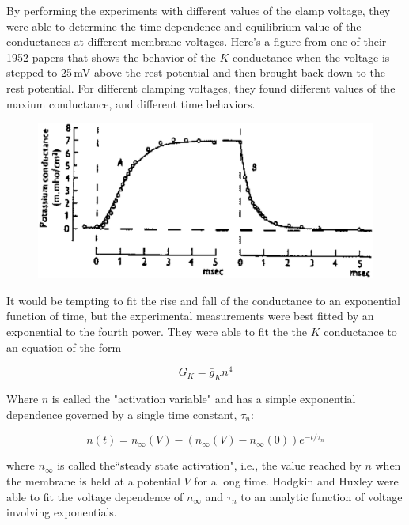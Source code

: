 \documentclass[12pt]{article}
\begin{document}
By performing the experiments with different values of the clamp voltage, they were able to determine the time dependence and equilibrium value of the conductances at different membrane voltages. Here's a figure from one of their 1952 papers that shows the behavior of the $K$ conductance when the voltage is stepped to 25\,mV above the rest potential and then brought back down to the rest potential. For different clamping voltages, they found different values of the maxium conductance, and different time behaviors.

\begin{figure}[h]
  \centering
 \includegraphics[scale=0.5]{figs/vcdata.eps}
  \label{fig:vcdata}
\end{figure}

It would be tempting to fit the rise and fall of the conductance to an exponential function of time, but the experimental measurements were best fitted by an exponential to the fourth power. They were able to fit the the $K$ conductance to an equation of the form

\begin{equation}
		G_K = \bar{g}_Kn^4
\label{eq:eq2}		
\end{equation}

Where $n$ is called the "activation variable" and has a simple exponential dependence governed by a single time constant, $\tau_n$:

\begin{equation}
		n(t) = n_\infty(V)-(n_\infty(V)-n_\infty(0))e^{-t/\tau_n}
\label{eq:eq3}		
\end{equation}

where $n_\infty$ is called the``steady state activation", i.e., the value reached by $n$ when the membrane is held at a potential $V$ for a long time. Hodgkin and Huxley were able to fit the voltage dependence of $n_\infty$ and $\tau_n$ to an analytic function of voltage involving exponentials.
\end{document}
